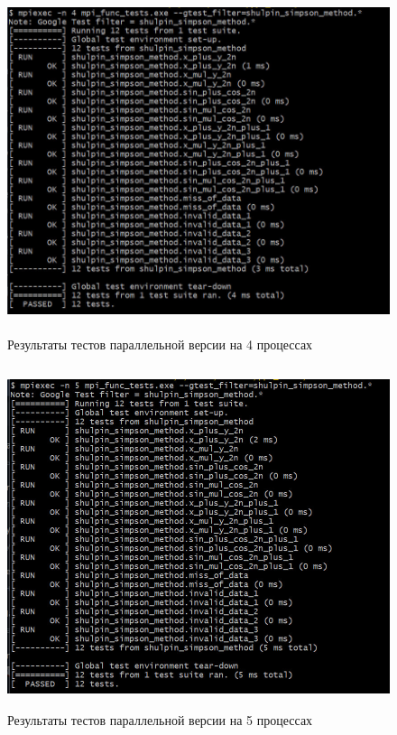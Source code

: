 \documentclass[12pt,a4paper]{article}
\begin{document}
\begin{figure}[H]
\centering
\includegraphics[height=10cm]{img/4nmpitest.jpg}
\caption{\label{fig:visualClass} Результаты тестов параллельной версии на 4 процессах}
\end{figure}

\begin{figure}[H]
\centering
\includegraphics[height=10cm]{img/5nmpitest.jpg}
\caption{\label{fig:visualClass} Результаты тестов параллельной версии на 5 процессах}
\end{figure}
\end{document}
